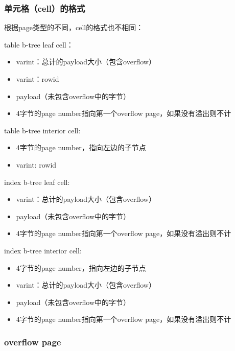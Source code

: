 \documentclass[12pt]{article}
\begin{document}
\subsubsection{单元格（cell）的格式}\label{ux5355ux5143ux683ccellux7684ux683cux5f0f}

根据page类型的不同，cell的格式也不相同：

table b-tree leaf cell：

\begin{itemize}
\tightlist
\item
  varint：总计的payload大小（包含overflow）
\item
  varint：rowid
\item
  payload（未包含overflow中的字节）
\item
  4字节的page number指向第一个overflow page，如果没有溢出则不计
\end{itemize}

table b-tree interior cell:

\begin{itemize}
\tightlist
\item
  4字节的page number，指向左边的子节点
\item
  varint: rowid
\end{itemize}

index b-tree leaf cell:

\begin{itemize}
\tightlist
\item
  varint：总计的payload大小（包含overflow）
\item
  payload（未包含overflow中的字节）
\item
  4字节的page number指向第一个overflow page，如果没有溢出则不计
\end{itemize}

index b-tree interior cell:

\begin{itemize}
\tightlist
\item
  4字节的page number，指向左边的子节点
\item
  varint：总计的payload大小（包含overflow）
\item
  payload（未包含overflow中的字节）
\item
  4字节的page number指向第一个overflow page，如果没有溢出则不计
\end{itemize}

\subsubsection{overflow page}\label{overflow-page}
\end{document}
